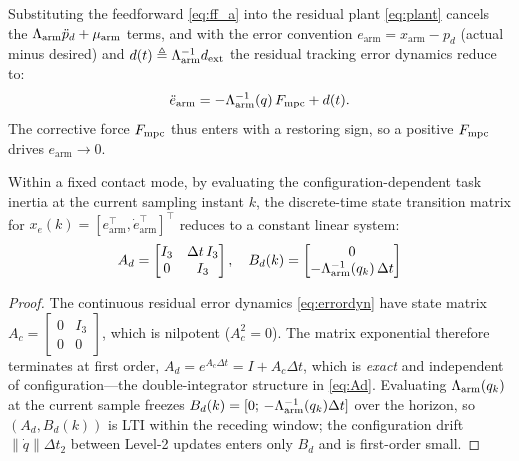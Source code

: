 Substituting the feedforward \eqref{eq:ff_a} into the residual plant
\eqref{eq:plant} cancels the $\Lambda_{\text{arm}}\ddot p_d+\mu_{\text{arm}}$ terms, and with
the error convention $e_{\text{arm}}=x_{\text{arm}}-p_d$ (actual minus
desired) and $d(t)\triangleq\Lambda_{\text{arm}}^{-1}d_{\text{ext}}$ the residual tracking
error dynamics reduce to:
\begin{equation}\label{eq:errordyn}
  \ddot{e}_{\text{arm}} = -\Lambda_{\text{arm}}^{-1}(q)\,F_{\text{mpc}} + d(t).
\end{equation}
The corrective force $F_{\text{mpc}}$ thus enters with a restoring sign, so a positive
$F_{\text{mpc}}$ drives $e_{\text{arm}}\to0$.

\begin{proposition}
\label{prop:constant_Ad}
Within a fixed contact mode, by evaluating the configuration-dependent task
inertia at the current sampling instant $k$, the discrete-time state
transition matrix for $x_e(k)=[e_{\text{arm}}^\top,\dot{e}_{\text{arm}}^\top]^\top$
reduces to a constant linear system:
\begin{equation}\label{eq:Ad}
  A_d = \begin{bmatrix}I_3 & \Delta t\,I_3 \\ 0 & I_3\end{bmatrix},
  \quad
  B_d(k) = \begin{bmatrix}0 \\ -\Lambda_{\text{arm}}^{-1}(q_k)\,\Delta t\end{bmatrix}
\end{equation}
\end{proposition}

\begin{proof}
The continuous residual error dynamics \eqref{eq:errordyn} have state matrix
$A_c=\left[\begin{smallmatrix}0&I_3\\0&0\end{smallmatrix}\right]$, which is
nilpotent ($A_c^2=0$). The matrix exponential therefore terminates at first
order, $A_d=e^{A_c\Delta t}=I+A_c\Delta t$, which is \emph{exact} and
independent of configuration---the double-integrator structure in
\eqref{eq:Ad}. Evaluating $\Lambda_{\text{arm}}(q_k)$ at the current sample freezes
$B_d(k)=[0;\,-\Lambda_{\text{arm}}^{-1}(q_k)\Delta t]$ over the horizon, so $(A_d,B_d(k))$ is
LTI within the receding window; the configuration drift
$\|\dot q\|\Delta t_2$ between Level-2 updates enters only $B_d$ and is
first-order small.
\end{proof}

